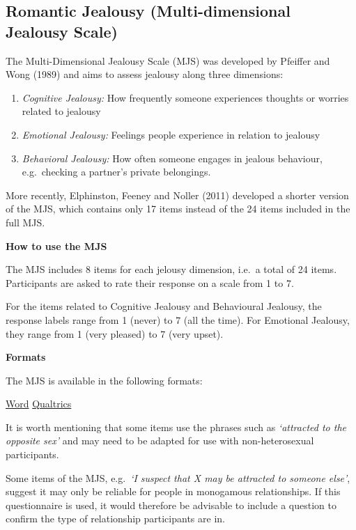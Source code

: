 \documentclass[
]{book}
\providecommand{\tightlist}{%
  \setlength{\itemsep}{0pt}\setlength{\parskip}{0pt}}
\begin{document}
\hypertarget{romantic-jealousy-multi-dimensional-jealousy-scale}{%
\subsection{Romantic Jealousy (Multi-dimensional Jealousy Scale)}\label{romantic-jealousy-multi-dimensional-jealousy-scale}}

The Multi-Dimensional Jealousy Scale (MJS) was developed by Pfeiffer and Wong (1989) and aims to assess jealousy along three dimensions:

\begin{enumerate}
\def\labelenumi{\arabic{enumi}.}
\tightlist
\item
  \emph{Cognitive Jealousy:} How frequently someone experiences thoughts or worries related to jealousy
\item
  \emph{Emotional Jealousy:} Feelings people experience in relation to jealousy
\item
  \emph{Behavioral Jealousy:} How often someone engages in jealous behaviour, e.g.~checking a partner's private belongings.
\end{enumerate}

More recently, Elphinston, Feeney and Noller (2011) developed a shorter version of the MJS, which contains only 17 items instead of the 24 items included in the full MJS.

\textbf{How to use the MJS}

The MJS includes 8 items for each jelousy dimension, i.e.~a total of 24 items. Participants are asked to rate their response on a scale from 1 to 7.

For the items related to Cognitive Jealousy and Behavioural Jealousy, the response labels range from 1 (never) to 7 (all the time). For Emotional Jealousy, they range from 1 (very pleased) to 7 (very upset).

\textbf{Formats}

The MJS is available in the following formats:

\href{questionnaires/Multi-dimensionalJealousyScale.docx}{Word} \textbar{} \href{questionnaires/Multi-dimensionalJealousyScale.qsf}{Qualtrics}

It is worth mentioning that some items use the phrases such as \emph{`attracted to the opposite sex'} and may need to be adapted for use with non-heterosexual participants.

Some items of the MJS, e.g.~\emph{`I suspect that X may be attracted to someone else'}, suggest it may only be reliable for people in monogamous relationships. If this questionnaire is used, it would therefore be advisable to include a question to confirm the type of relationship participants are in.
\end{document}
